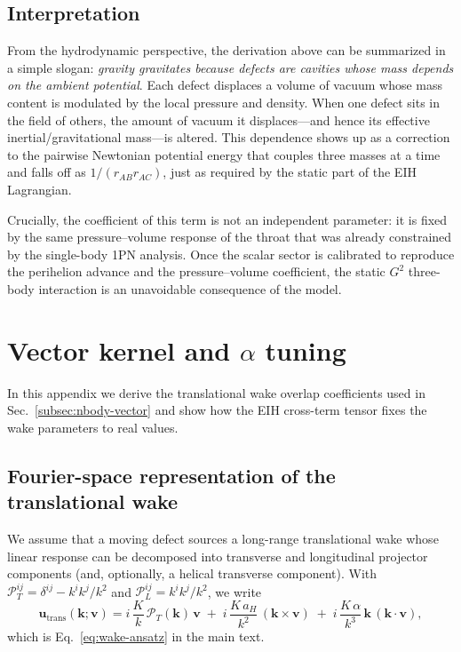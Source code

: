 \documentclass[11pt]{article}
\begin{document}
\subsection{Interpretation}

From the hydrodynamic perspective, the derivation above can be
summarized in a simple slogan: \emph{gravity gravitates because
defects are cavities whose mass depends on the ambient potential}.
Each defect displaces a volume of vacuum whose mass content is
modulated by the local pressure and density.
When one defect sits in the field of others, the amount of vacuum it
displaces---and hence its effective inertial/gravitational mass---is
altered.
This dependence shows up as a correction to the pairwise Newtonian
potential energy that couples three masses at a time and falls off as
$1/(r_{AB} r_{AC})$, just as required by the static part of the EIH
Lagrangian.

Crucially, the coefficient of this term is not an independent
parameter: it is fixed by the same pressure--volume response of the
throat that was already constrained by the single-body 1PN analysis.
Once the scalar sector is calibrated to reproduce the perihelion
advance and the pressure--volume coefficient, the static $G^2$
three-body interaction is an unavoidable consequence of the model.

\section{Vector kernel and \texorpdfstring{$\alpha$}{alpha} tuning}
\label{app:alpha-tuning}

In this appendix we derive the translational wake overlap coefficients used in
Sec.~\ref{subsec:nbody-vector} and show how the EIH cross-term tensor fixes the
wake parameters to real values.

\subsection{Fourier-space representation of the translational wake}

We assume that a moving defect sources a long-range translational wake whose
linear response can be decomposed into transverse and longitudinal projector
components (and, optionally, a helical transverse component).
With $\mathcal{P}_T^{ij}=\delta^{ij}-k^i k^j/k^2$ and
$\mathcal{P}_L^{ij}=k^i k^j/k^2$, we write
\begin{equation}
  \mathbf{u}_{\text{trans}}(\mathbf{k};\mathbf{v})
  =
  i\,\frac{K}{k}\,\mathcal{P}_T(\mathbf{k})\,\mathbf{v}
  \;+\;
  i\,\frac{K\,a_H}{k^2}\,(\mathbf{k}\times \mathbf{v})
  \;+\;
  i\,\frac{K\,\alpha}{k^3}\,\mathbf{k}\,(\mathbf{k}\cdot\mathbf{v}),
\end{equation}
which is Eq.~\eqref{eq:wake-ansatz} in the main text.
\end{document}
